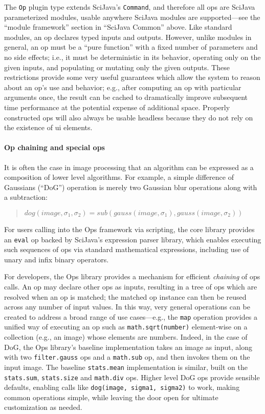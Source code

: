 \documentclass{bmcart}
\begin{document}
The \texttt{Op} plugin type extends SciJava's \texttt{Command}, and therefore
all ops are SciJava parameterized modules, usable anywhere SciJava modules are
supported---see the ``module framework'' section in ``SciJava Common'' above.
Like standard modules, an op declares typed inputs and outputs. However, unlike
modules in general, an op must be a ``pure function'' with a fixed number of
parameters and no side effects; i.e., it must be deterministic in its behavior,
operating only on the given inputs, and populating or mutating only the given
outputs. These restrictions provide some very useful guarantees which allow the
system to reason about an op's use and behavior; e.g., after computing an op
with particular arguments once, the result can be cached to dramatically
improve subsequent time performance at the potential expense of additional
space. Properly constructed ops will also always be usable headless because
they do not rely on the existence of \acrshort{ui} elements.

\paragraph*{Op chaining and special ops}
It is often the case in image processing that an algorithm can be expressed as
a composition of lower level algorithms. For example, a simple difference of
Gaussians (``DoG'') operation is merely two Gaussian blur operations along with
a subtraction:

\begin{quote}
  $dog(image, \sigma_1, \sigma_2) =
  sub(gauss(image, \sigma_1), gauss(image, \sigma_2))$
\end{quote}

For users calling into the Ops framework via scripting, the core library
provides an \texttt{eval} op backed by SciJava's expression parser library,
which enables executing such sequences of ops via standard mathematical
expressions, including use of unary and infix binary operators.

For developers, the Ops library provides a mechanism for efficient
\textit{chaining} of ops calls. An op may declare other ops as inputs,
resulting in a tree of ops which are resolved when an op is matched; the
matched op instance can then be reused across any number of input values. In
this way, very general operations can be created to address a broad range of
use cases---e.g., the \texttt{map} operation provides a unified way of
executing an op such as \texttt{math.sqrt(number)} element-wise on a collection
(e.g., an image) whose elements are numbers. Indeed, in the case of DoG, the
Ops library's baseline implementation takes an image as input, along with two
\texttt{filter.gauss} ops and a \texttt{math.sub} op, and then invokes them on
the input image. The baseline \texttt{stats.mean} implementation is similar,
built on the \texttt{stats.sum}, \texttt{stats.size} and \texttt{math.div} ops.
Higher level DoG ops provide sensible defaults, enabling calls like
\texttt{dog(image, sigma1, sigma2)} to work, making common operations simple,
while leaving the door open for ultimate customization as needed.
\end{document}
